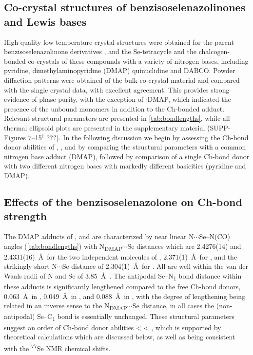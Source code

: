 \begin{refsection}
\subsection{Co-crystal structures of benzisoselenazolinones and Lewis bases}
High quality low temperature crystal structures were obtained for the parent benzisoselenazolinone derivatives  \autocite{Thomas2015},  and the Se-tetracycle  and the chalcogen-bonded co-crystals of these compounds with a variety of nitrogen bases, including pyridine, dimethylaminopyridine (DMAP) quinuclidine and DABCO.
Powder diffaction patterns were obtained of the bulk co-crystal material and compared with the single crystal data, with excellent agreement.
This provides strong evidence of phase purity, with the exception of $\cdot$DMAP, which indicated the presence of the unbound monomers in addition to the Ch-bonded adduct.
Relevant structural parameters are presented in \cref{tab:bondlengths}, while all thermal ellipsoid plots are presented in the supplementary material (SUPP-Figures 7--15$^\dag$ ???).
In the following discussion we begin by assessing the Ch-bond donor abilities of , , and  by comparing the structural parameters with a common nitrogen base adduct (DMAP), followed by comparison of a single Ch-bond donor  with two different nitrogen bases with markedly different basicities (pyridine and DMAP).

\subsection{Effects of the benzisoselenazolone on Ch-bond strength}
The DMAP adducts of ,  and  are characterized by near linear N$\cdots$Se--N(CO) angles (\cref{tab:bondlengths}) with N\textsubscript{DMAP}$\cdots$Se distances which are 2.4276(14) and 2.4331(16)~\AA \ for the two independent molecules of , 2.371(1)~\AA\ for , and the strikingly short N$\cdots$Se distance of 2.304(1)~\AA\ for .
All are well within the van der Waals radii of N and Se of 3.85~\AA\ \autocite{Batsanov2001}.
The antipodal Se--N\textsubscript{1} bond distance within these adducts is significantly lengthened compared to the free Ch-bond donors, 0.063~\AA\ in , 0.049~\AA\ in , and 0.088~\AA\ in , with the degree of lengthening being related in an inverse sense to the N\textsubscript{DMAP}$\cdots$Se distance, in all cases the (non-antipodal) Se--C\textsubscript{1} bond is essentially unchanged.
These structural parameters suggest an order of Ch-bond donor abilities  <  < , which is supported by theoretical calculations which are discussed below, as well as being consistent with the \textsuperscript{77}Se NMR chemical shifts.


\end{refsection}
